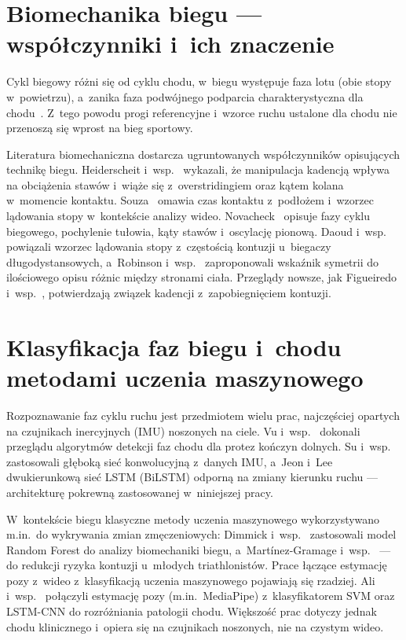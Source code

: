 \section{Biomechanika biegu --- współczynniki i~ich znaczenie}
\label{sec:sota-wspolczynniki}

Cykl biegowy różni się od cyklu chodu, w~biegu występuje faza lotu (obie stopy w~powietrzu), a~zanika faza podwójnego podparcia charakterystyczna dla chodu~\cite{novacheck1998}. Z~tego powodu progi referencyjne i~wzorce ruchu ustalone dla chodu nie przenoszą się wprost na bieg sportowy.

Literatura biomechaniczna dostarcza ugruntowanych współczynników opisujących technikę biegu. Heiderscheit i~wsp.~\cite{heiderscheit2011} wykazali, że manipulacja kadencją wpływa na obciążenia stawów i~wiąże się z~overstridingiem oraz kątem kolana w~momencie kontaktu. Souza~\cite{souza2016} omawia czas kontaktu z~podłożem i~wzorzec lądowania stopy w~kontekście analizy wideo. Novacheck~\cite{novacheck1998} opisuje fazy cyklu biegowego, pochylenie tułowia, kąty stawów i~oscylację pionową. Daoud i~wsp.~\cite{daoud2012} powiązali wzorzec lądowania stopy z~częstością kontuzji u~biegaczy długodystansowych, a~Robinson i~wsp.~\cite{robinson1987} zaproponowali wskaźnik symetrii do ilościowego opisu różnic między stronami ciała. Przeglądy nowsze, jak Figueiredo i~wsp.~\cite{figueiredo2025cadence}, potwierdzają związek kadencji z~zapobiegnięciem kontuzji.

\section{Klasyfikacja faz biegu i~chodu metodami uczenia maszynowego}
\label{sec:sota-klasyfikatory}

Rozpoznawanie faz cyklu ruchu jest przedmiotem wielu prac, najczęściej opartych na czujnikach inercyjnych (IMU) noszonych na ciele. Vu i~wsp.~\cite{vu2020review} dokonali przeglądu algorytmów detekcji faz chodu dla protez kończyn dolnych. Su i~wsp.~\cite{su2020dcnn} zastosowali głęboką sieć konwolucyjną z~danych IMU, a~Jeon i~Lee~\cite{jeon2024bilstm} dwukierunkową sieć LSTM (BiLSTM) odporną na zmiany kierunku ruchu --- architekturę pokrewną zastosowanej w~niniejszej pracy.

W~kontekście biegu klasyczne metody uczenia maszynowego wykorzystywano m.in.\ do wykrywania zmian zmęczeniowych: Dimmick i~wsp.~\cite{dimmick2023fatigue} zastosowali model Random Forest do analizy biomechaniki biegu, a~Martínez-Gramage i~wsp.~\cite{martinez2020rf} --- do redukcji ryzyka kontuzji u~młodych triathlonistów. Prace łączące estymację pozy z~wideo z~klasyfikacją uczenia maszynowego pojawiają się rzadziej. Ali i~wsp.~\cite{ali2024dmd} połączyli estymację pozy (m.in.\ MediaPipe) z~klasyfikatorem SVM oraz LSTM-CNN do rozróżniania patologii chodu. Większość prac dotyczy jednak chodu klinicznego i~opiera się na czujnikach noszonych, nie na czystym wideo.

